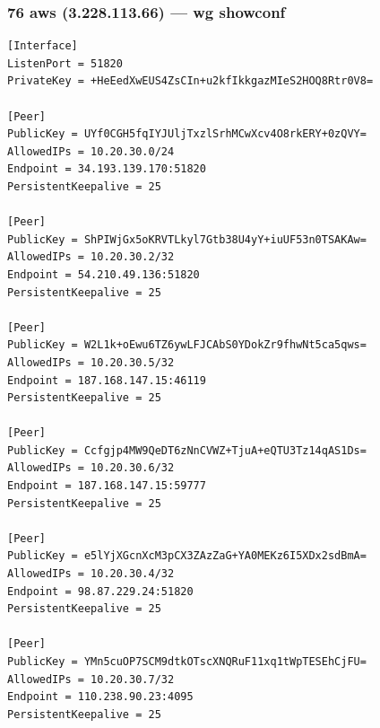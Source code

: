 \documentclass[11pt,a4paper]{article}
\begin{document}
\subsubsection*{76 aws (3.228.113.66) — wg showconf}
\begin{lstlisting}
[Interface]
ListenPort = 51820
PrivateKey = +HeEedXwEUS4ZsCIn+u2kfIkkgazMIeS2HOQ8Rtr0V8=

[Peer]
PublicKey = UYf0CGH5fqIYJUljTxzlSrhMCwXcv4O8rkERY+0zQVY=
AllowedIPs = 10.20.30.0/24
Endpoint = 34.193.139.170:51820
PersistentKeepalive = 25

[Peer]
PublicKey = ShPIWjGx5oKRVTLkyl7Gtb38U4yY+iuUF53n0TSAKAw=
AllowedIPs = 10.20.30.2/32
Endpoint = 54.210.49.136:51820
PersistentKeepalive = 25

[Peer]
PublicKey = W2L1k+oEwu6TZ6ywLFJCAbS0YDokZr9fhwNt5ca5qws=
AllowedIPs = 10.20.30.5/32
Endpoint = 187.168.147.15:46119
PersistentKeepalive = 25

[Peer]
PublicKey = Ccfgjp4MW9QeDT6zNnCVWZ+TjuA+eQTU3Tz14qAS1Ds=
AllowedIPs = 10.20.30.6/32
Endpoint = 187.168.147.15:59777
PersistentKeepalive = 25

[Peer]
PublicKey = e5lYjXGcnXcM3pCX3ZAzZaG+YA0MEKz6I5XDx2sdBmA=
AllowedIPs = 10.20.30.4/32
Endpoint = 98.87.229.24:51820
PersistentKeepalive = 25

[Peer]
PublicKey = YMn5cuOP7SCM9dtkOTscXNQRuF11xq1tWpTESEhCjFU=
AllowedIPs = 10.20.30.7/32
Endpoint = 110.238.90.23:4095
PersistentKeepalive = 25

\end{lstlisting}
\end{document}
